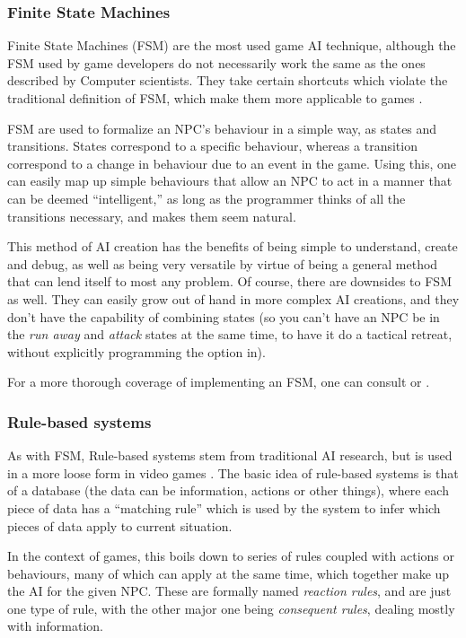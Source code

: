 \documentclass[]{report}
\begin{document}
\subsubsection{Finite State Machines}
\label{sec:finite-state-mach}

Finite State Machines (FSM) are the most used game AI technique, although the
FSM used by game developers do not necessarily work the same as the ones
described by Computer scientists. They take certain shortcuts which violate the
traditional definition of FSM, which make them more applicable to games
\citep{rabin2002implementing}.

FSM are used to formalize an NPC's behaviour in a simple way, as states and
transitions. States correspond to a specific behaviour, whereas a transition
correspond to a change in behaviour due to an event in the game. Using this, one
can easily map up simple behaviours that allow an NPC to act in a manner that
can be deemed ``intelligent,'' as long as the programmer thinks of all the
transitions necessary, and makes them seem natural.

This method of AI creation has the benefits of being simple to understand,
create and debug, as well as being very versatile by virtue of being a general
method that can lend itself to most any problem. Of course, there are downsides
to FSM as well. They can easily grow out of hand in more complex AI creations,
and they don't have the capability of combining states (so you can't have an NPC
be in the \emph{run away} and \emph{attack} states at the same time, to have it
do a tactical retreat, without explicitly programming the option in).

For a more thorough coverage of implementing an FSM, one can consult
\citet{rabin2002implementing} or \citet[][chap.~3]{kirby2011introduction}.

\subsubsection{Rule-based systems}
\label{sec:rule-based-systems}

As with FSM, Rule-based systems stem from traditional AI research, but is used
in a more loose form in video games \citep{christian2002simple}. The basic idea
of rule-based systems is that of a database (the data can be information,
actions or other things), where each piece of data has a ``matching rule'' which
is used by the system to infer which pieces of data apply to current situation.

In the context of games, this boils down to series of rules coupled with actions
or behaviours, many of which can apply at the same time, which together make up
the AI for the given NPC. These are formally named \emph{reaction rules}, and
are just one type of rule, with the other major one being \emph{consequent
  rules}, dealing mostly with information.
\end{document}
